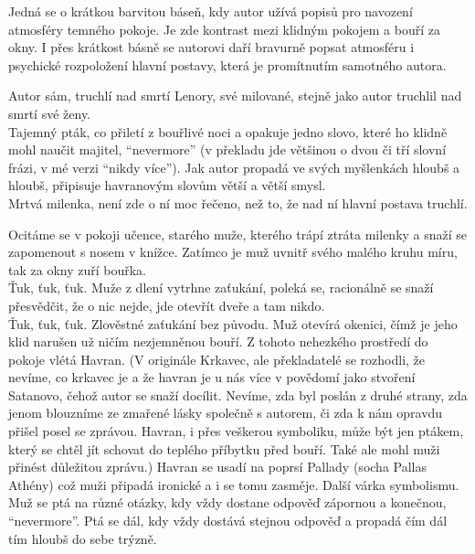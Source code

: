 \documentclass{extarticle} %
\begin{document}

\noindent 
Jedná se o krátkou barvitou báseň, kdy autor užívá popisů pro navození atmosféry temného pokoje.
Je zde kontrast mezi klidným pokojem a bouří za okny.
I přes krátkost básně se autorovi daří bravurně popsat atmosféru i psychické rozpoložení hlavní postavy,
která je promítnutím samotného autora.

\noindent
{} Autor sám, truchlí nad smrtí Lenory, své milované,
stejně jako autor truchlil nad smrtí své ženy.\\
 Tajemný pták, co přiletí z bouřlivé noci a opakuje jedno slovo,
které ho klidně mohl naučit majitel, \enquote{nevermore}
(v překladu jde většinou o dvou či tří slovní frázi, v mé verzi \enquote{nikdy více}).
Jak autor propadá ve svých myšlenkách hloubš a hloubš, připisuje havranovým slovům větší a větší smysl.\\
 Mrtvá milenka, není zde o ní moc řečeno, než to, že nad ní hlavní postava truchlí.

{\setlength{\parindent}{0pt}\setlength{\parskip}{0.5em}
\noindent Ocitáme se v pokoji učence, starého muže, kterého trápí ztráta milenky
a snaží se zapomenout s nosem v knížce. Zatímco je muž uvnitř svého malého kruhu míru,
tak za okny zuří bouřka.\\
Ťuk, ťuk, ťuk. Muže z dlení vytrhne zaťukání, poleká se, racionálně se snaží přesvědčit,
že o nic nejde, jde otevřít dveře a tam nikdo.\\
Ťuk, ťuk, ťuk. Zlověstné zaťukání bez původu. Muž otevírá okenici,
čímž je jeho klid narušen už ničím nezjemněnou bouří.
Z tohoto nehezkého prostředí do pokoje vlétá Havran.
(V originále Krkavec, ale překladatelé se rozhodli, že nevíme, co krkavec je
a že havran je u nás více v povědomí jako stvoření Satanovo, čehož autor se snaží docílit.
Nevíme, zda byl poslán z druhé strany, zda jenom blouzníme ze zmařené lásky společně s autorem,
či zda k nám opravdu přišel posel se zprávou. Havran, i přes veškerou symboliku, může být jen ptákem,
který se chtěl jít schovat do teplého příbytku před bouří. Také ale mohl muži přinést důležitou zprávu.)
Havran se usadí na poprsí Pallady (socha Pallas Athény) což muži připadá ironické a i se tomu zasměje.
Další várka symbolismu.\\
Muž se ptá na různé otázky, kdy vždy dostane odpověď zápornou a konečnou, \enquote{nevermore}.
Ptá se dál, kdy vždy dostává stejnou odpověď a propadá čím dál tím hloubš do sebe trýzně.
}
\end{document}

